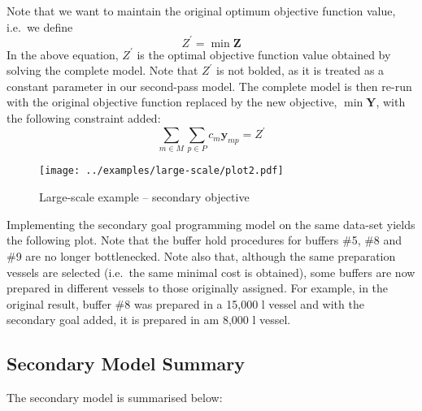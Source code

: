 Note that we want to maintain the original optimum objective function value,
i.e.\ we define
\begin{equation}
    Z^{\prime} = \min \boldsymbol{Z}
\end{equation}
In the above equation, $Z^{\prime}$ is the optimal objective function value
obtained by solving the complete model.
Note that $Z^{\prime}$ is not bolded, as it is treated as a constant parameter
in our second-pass model.
The complete model is then re-run with the original objective function replaced
by the new objective, $\min \boldsymbol{Y}$, with the following constraint
added:
\begin{equation}
    \sum_{m \in M} \sum_{p \in P} c_m \boldsymbol{y}_{mp} = Z^{\prime}
    \label{eq.constr10}
\end{equation}
\begin{figure}
    \centering
    \texttt{[image: ../examples/large-scale/plot2.pdf]}
    \caption{Large-scale example -- secondary objective}
    \label{fig.secondary}
\end{figure}
Implementing the secondary goal programming model on the same data-set yields
the following plot.
Note that the buffer hold procedures for buffers \#5, \#8 and \#9 are no longer
bottlenecked.
Note also that, although the same preparation vessels are selected (i.e.\ the
same minimal cost is obtained), some buffers are now prepared in different
vessels to those originally assigned.
For example, in the original result, buffer \#8 was prepared in a 15,000 l
vessel and with the secondary goal added, it is prepared in am 8,000 l vessel.

\subsection{Secondary Model Summary}\label{SS.model2summary}

The secondary model is summarised below:

